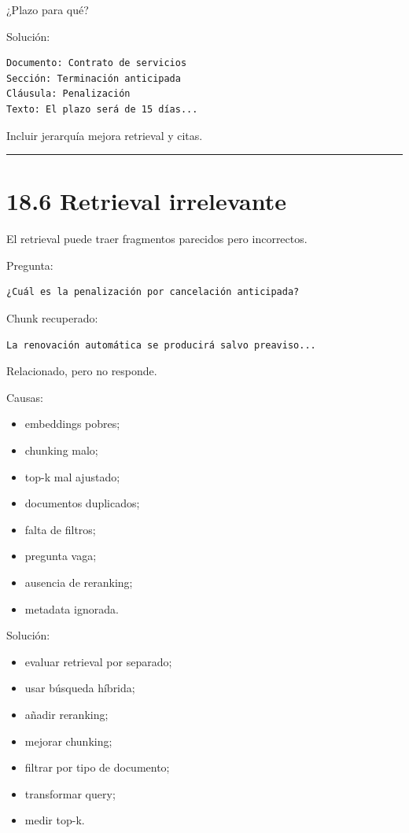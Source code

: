 ¿Plazo para qué?

Solución:

\begin{lstlisting}
Documento: Contrato de servicios
Sección: Terminación anticipada
Cláusula: Penalización
Texto: El plazo será de 15 días...
\end{lstlisting}

Incluir jerarquía mejora retrieval y citas.

\begin{center}\rule{0.5\linewidth}{0.5pt}\end{center}

\section{18.6 Retrieval irrelevante}\label{retrieval-irrelevante}

El retrieval puede traer fragmentos parecidos pero incorrectos.

Pregunta:

\begin{lstlisting}
¿Cuál es la penalización por cancelación anticipada?
\end{lstlisting}

Chunk recuperado:

\begin{lstlisting}
La renovación automática se producirá salvo preaviso...
\end{lstlisting}

Relacionado, pero no responde.

Causas:

\begin{itemize}
\tightlist
\item
  embeddings pobres;
\item
  chunking malo;
\item
  top-k mal ajustado;
\item
  documentos duplicados;
\item
  falta de filtros;
\item
  pregunta vaga;
\item
  ausencia de reranking;
\item
  metadata ignorada.
\end{itemize}

Solución:

\begin{itemize}
\tightlist
\item
  evaluar retrieval por separado;
\item
  usar búsqueda híbrida;
\item
  añadir reranking;
\item
  mejorar chunking;
\item
  filtrar por tipo de documento;
\item
  transformar query;
\item
  medir top-k.
\end{itemize}

